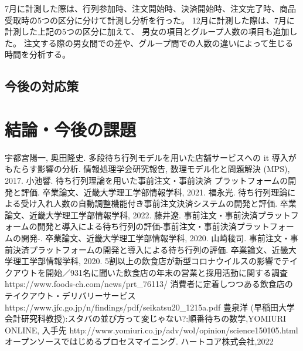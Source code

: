 \documentclass{jsarticle}
\begin{document}
7月に計測した際は、行列参加時、注文開始時、決済開始時、注文完了時、商品受取時の5つの区分に分けて計測し分析を行った。
12月に計測した際は、7月に計測した上記の5つの区分に加えて、
男女の項目とグループ人数の項目も追加した。
注文する際の男女間での差や、グループ間での人数の違いによって生じる時間を分析する。













\newpage
\subsection{今後の対応策}




\newpage

\section{結論・今後の課題}






\newpage

\begin{thebibliography}{99}
 宇都宮陽一, 奥田隆史. 多段待ち行列モデルを用いた店舗サービスへの it 導入がもたらす影響の分析. 情報処理学会研究報告, 数理モデル化と問題解決 (MPS), 2017.
 小池響. 待ち行列理論を用いた事前注文・事前決済 プラットフォームの開発と評価. 卒業論文、近畿大学理工学部情報学科, 2021.
 福永光. 待ち行列理論による受け入れ人数の自動調整機能付き事前注文決済システムの開発と評価. 卒業論文、近畿大学理工学部情報学科, 2022.
藤井遼. 事前注文・事前決済プラットフォームの開発と導入による待ち行列の評価-事前注文・事前決済プラットフォームの開発-. 卒業論文、近畿大学理工学部情報学科, 2020.
山崎稜司. 事前注文・事前決済プラットフォームの開発と導入による待ち行列の評価. 卒業論文、近畿大学理工学部情報学科, 2020.
5割以上の飲食店が新型コロナウイルスの影響でテイクアウトを開始／931名に聞いた飲食店の年末の営業と採用活動に関する調査 https://www.foods-ch.com/news/prt\_76113/  
消費者に定着しつつある飲食店のテイクアウト・デリバリーサービス\\
https://www.jfc.go.jp/n/findings/pdf/seikatsu20\_1215a.pdf
豊泉洋 (早稲田大学会計研究科教授):スタバの並び方って変じゃない?:順番待ちの数学,YOMIURI ONLINE, 入手先 http://www.yomiuri.co.jp/adv/wol/opinion/science150105.html
オープンソースではじめるプロセスマイニング. ハートコア株式会社,2022
\end{thebibliography}
\end{document}
